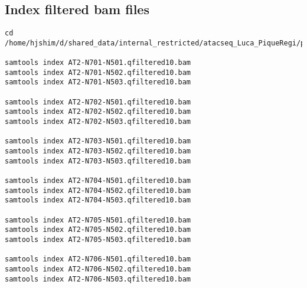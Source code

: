 \documentclass[11pt]{article}
\begin{document}
\subsection{Index filtered bam files}
\label{sec-2-4}
\begin{lstlisting}
cd /home/hjshim/d/shared_data/internal_restricted/atacseq_Luca_PiqueRegi/processedbamfiles/

samtools index AT2-N701-N501.qfiltered10.bam
samtools index AT2-N701-N502.qfiltered10.bam
samtools index AT2-N701-N503.qfiltered10.bam

samtools index AT2-N702-N501.qfiltered10.bam
samtools index AT2-N702-N502.qfiltered10.bam
samtools index AT2-N702-N503.qfiltered10.bam

samtools index AT2-N703-N501.qfiltered10.bam
samtools index AT2-N703-N502.qfiltered10.bam
samtools index AT2-N703-N503.qfiltered10.bam

samtools index AT2-N704-N501.qfiltered10.bam
samtools index AT2-N704-N502.qfiltered10.bam
samtools index AT2-N704-N503.qfiltered10.bam

samtools index AT2-N705-N501.qfiltered10.bam
samtools index AT2-N705-N502.qfiltered10.bam
samtools index AT2-N705-N503.qfiltered10.bam

samtools index AT2-N706-N501.qfiltered10.bam
samtools index AT2-N706-N502.qfiltered10.bam
samtools index AT2-N706-N503.qfiltered10.bam
\end{lstlisting}
\end{document}
